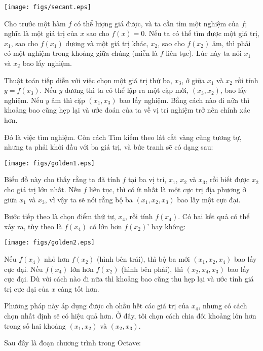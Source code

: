 \documentclass[12pt]{book}
\begin{document}
\centerline{\texttt{[image: figs/secant.eps]}}

Cho trước một hàm $f$ có thể lượng giá được, và ta cần tìm một
nghiệm của $f$; nghĩa là một giá trị của $x$ sao cho $f(x)=0$.  
Nếu ta có thể tìm được một giá trị, $x_1$, sao cho $f(x_1)$ 
dương và một giá trị khác, $x_2$, sao cho $f(x_2)$ âm, thì
phải có một nghiệm trong khoảng giữa chúng (miễn là $f$ liên tục).
Lúc này ta nói $x_1$ và $x_2$ bao lấy nghiệm.

Thuật toán tiếp diễn với việc chọn một giá trị thứ ba, $x_3$, 
ở giữa $x_1$ và $x_2$ rồi tính $y = f(x_3)$.  Nếu $y$ dương thì ta
có thể lập ra một cặp mới, $(x_3, x_2)$, bao lấy nghiệm. Nếu 
$y$ âm thì cặp $(x_1, x_3)$ bao lấy nghiệm. Bằng cách nào đi nữa
thì khoảng bao cũng hẹp lại và ước đoán của ta về vị trí nghiệm
trở nên chính xác hơn.

Đó là việc tìm nghiệm. Còn cách Tìm kiếm theo lát cắt vàng cũng
tương tự, nhưng ta phải khởi đầu với ba giá trị, và bức tranh
sẽ có dạng sau:

\centerline{\texttt{[image: figs/golden1.eps]}}

Biểu đồ này cho thấy rằng ta đã tính $f$ tại ba vị trí,
$x_1$, $x_2$ và $x_3$, rồi biết được $x_2$ cho giá trị lớn nhất.
Nếu $f$ liên tục, thì có ít nhất là một cực trị địa phương ở
giữa $x_1$ và $x_3$, vì vậy ta sẽ nói rằng bộ ba $(x_1, x_2, x_3)$
bao lấy một cực đại.

Bước tiếp theo là chọn điểm thứ tư, $x_4$, rồi tính $f(x_4)$. 
Có hai kết quả có thể xảy ra, tùy theo là $f(x_4)$ có lớn hơn $f(x_2)$'
hay không:

\centerline{\texttt{[image: figs/golden2.eps]}}

Nếu $f(x_4)$ nhỏ hơn  $f(x_2)$ (hình bên trái), thì bộ ba mới
$(x_1, x_2, x_4)$ bao lấy cực đại. Nếu $f(x_4)$ lớn hơn
$f(x_2)$ (hình bên phải), thì $(x_2, x_4, x_3)$ bao lấy cực đại.
Dù với cách nào đi nữa thì khoảng bao cũng thu hẹp lại và 
ước tính giá trị cực đại của $x$ càng tốt hơn.

Phương pháp này áp dụng được ch ohầu hết các giá trị của $x_4$,
nhưng có cách chọn nhất định sẽ có hiệu quả hơn. Ở đây, tôi chọn 
cách chia đôi khoảng lớn hơn trong số hai khoảng $(x_1, x_2)$ và 
$(x_2, x_3)$.

Sau đây là đoạn chương trình trong Octave:
\end{document}
